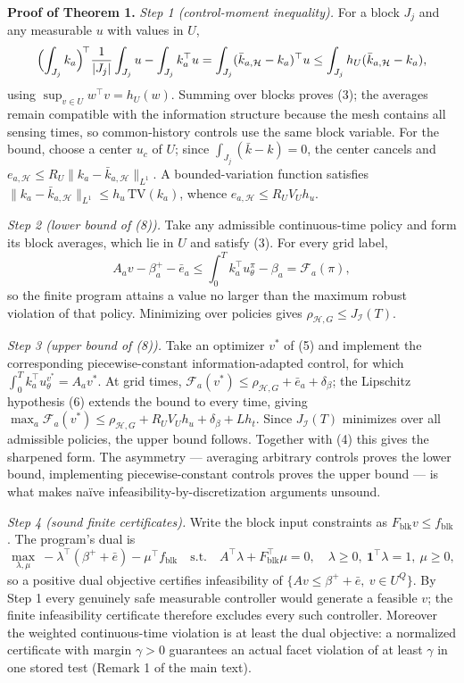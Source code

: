 \documentclass[10pt,article]{article}
\begin{document}
\textbf{Proof of Theorem 1.}
\emph{Step 1 (control-moment inequality).} For a block \(J_j\) and any
measurable \(u\) with values in \(U\),
\[
\Bigl(\int_{J_j} k_a\Bigr)^{\!\top} \frac{1}{|J_j|}\int_{J_j} u
- \int_{J_j} k_a^\top u
= \int_{J_j} (\bar k_{a,\mathcal H} - k_a)^\top u
\le \int_{J_j} h_U(\bar k_{a,\mathcal H} - k_a),
\]
using \(\sup_{v \in U} w^\top v = h_U(w)\). Summing over blocks proves (3);
the averages remain compatible with the information structure because the
mesh contains all sensing times, so common-history controls use the same
block variable. For the bound, choose a center \(u_c\) of \(U\); since
\(\int_{J_j}(\bar k - k) = 0\), the center cancels and
\(e_{a,\mathcal H} \le R_U \|k_a - \bar k_{a,\mathcal H}\|_{L^1}\). A
bounded-variation function satisfies \(\|k_a - \bar k_{a,\mathcal
H}\|_{L^1} \le h_u\, \mathrm{TV}(k_a)\), whence \(e_{a,\mathcal H} \le R_U
V_U h_u\).

\emph{Step 2 (lower bound of (8)).} Take any admissible continuous-time
policy and form its block averages, which lie in \(U\) and satisfy (3). For
every grid label,
\[
A_a v - \beta_a^{+} - \bar e_a \le \int_0^T k_a^\top u^\pi_\theta -
\beta_a = \mathcal F_a(\pi),
\]
so the finite program attains a value no larger than the maximum robust
violation of that policy. Minimizing over policies gives \(\rho_{\mathcal
H,G} \le J_{\mathcal I}(T)\).

\emph{Step 3 (upper bound of (8)).} Take an optimizer \(v^{*}\) of (5) and
implement the corresponding piecewise-constant information-adapted control,
for which \(\int_0^T k_a^\top u^{v^{*}}_\theta = A_a v^{*}\). At grid times,
\(\mathcal F_a(v^{*}) \le \rho_{\mathcal H,G} + \bar e_a + \delta_\beta\);
the Lipschitz hypothesis (6) extends the bound to every time, giving
\(\max_a \mathcal F_a(v^{*}) \le \rho_{\mathcal H,G} + R_U V_U h_u +
\delta_\beta + L h_t\). Since \(J_{\mathcal I}(T)\) minimizes over all
admissible policies, the upper bound follows. Together with (4) this gives
the sharpened form. The asymmetry --- averaging arbitrary controls proves
the lower bound, implementing piecewise-constant controls proves the upper
bound --- is what makes na\"ive infeasibility-by-discretization arguments
unsound.

\emph{Step 4 (sound finite certificates).} Write the block input constraints
as \(F_{\mathrm{blk}} v \le f_{\mathrm{blk}}\). The program's dual is
\[
\max_{\lambda,\mu}\ -\lambda^\top(\beta^{+} + \bar e) - \mu^\top
f_{\mathrm{blk}}
\quad \text{s.t.} \quad
A^\top \lambda + F_{\mathrm{blk}}^\top \mu = 0,\quad
\lambda \ge 0,\ \mathbf 1^\top \lambda = 1,\ \mu \ge 0,
\tag{12}
\]
so a positive dual objective certifies infeasibility of \(\{A v \le
\beta^{+} + \bar e,\ v \in U^{Q}\}\). By Step 1 every genuinely safe
measurable controller would generate a feasible \(v\); the finite
infeasibility certificate therefore excludes every such controller. Moreover
the weighted continuous-time violation is at least the dual objective: a
normalized certificate with margin \(\gamma > 0\) guarantees an actual facet
violation of at least \(\gamma\) in one stored test (Remark 1 of the main
text).
\end{document}
